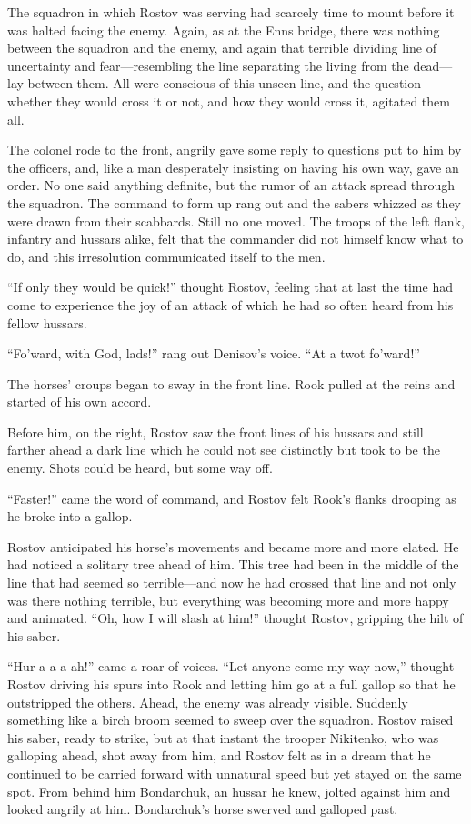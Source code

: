 The squadron in which Rostov was serving had scarcely time to
mount before it was halted facing the enemy. Again, as at the
Enns bridge, there was nothing between the squadron and the
enemy, and again that terrible dividing line of uncertainty and
fear---resembling the line separating the living from the
dead---lay between them. All were conscious of this unseen line,
and the question whether they would cross it or not, and how they
would cross it, agitated them all.

The colonel rode to the front, angrily gave some reply to
questions put to him by the officers, and, like a man desperately
insisting on having his own way, gave an order. No one said
anything definite, but the rumor of an attack spread through the
squadron. The command to form up rang out and the sabers whizzed
as they were drawn from their scabbards.  Still no one moved. The
troops of the left flank, infantry and hussars alike, felt that
the commander did not himself know what to do, and this
irresolution communicated itself to the men.

``If only they would be quick!'' thought Rostov, feeling that at
last the time had come to experience the joy of an attack of
which he had so often heard from his fellow hussars.

``Fo'ward, with God, lads!'' rang out Denisov's voice. ``At a
twot fo'ward!''

The horses' croups began to sway in the front line. Rook pulled
at the reins and started of his own accord.

Before him, on the right, Rostov saw the front lines of his
hussars and still farther ahead a dark line which he could not
see distinctly but took to be the enemy. Shots could be heard,
but some way off.

``Faster!'' came the word of command, and Rostov felt Rook's
flanks drooping as he broke into a gallop.

Rostov anticipated his horse's movements and became more and more
elated. He had noticed a solitary tree ahead of him. This tree
had been in the middle of the line that had seemed so
terrible---and now he had crossed that line and not only was
there nothing terrible, but everything was becoming more and more
happy and animated. ``Oh, how I will slash at him!'' thought
Rostov, gripping the hilt of his saber.

``Hur-a-a-a-ah!'' came a roar of voices. ``Let anyone come my way
now,'' thought Rostov driving his spurs into Rook and letting him
go at a full gallop so that he outstripped the others. Ahead, the
enemy was already visible. Suddenly something like a birch broom
seemed to sweep over the squadron. Rostov raised his saber, ready
to strike, but at that instant the trooper Nikitenko, who was
galloping ahead, shot away from him, and Rostov felt as in a
dream that he continued to be carried forward with unnatural
speed but yet stayed on the same spot. From behind him
Bondarchuk, an hussar he knew, jolted against him and looked
angrily at him. Bondarchuk's horse swerved and galloped past.

